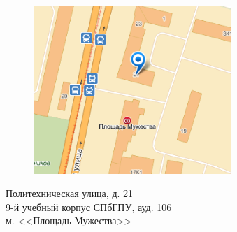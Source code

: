 \documentclass[12pt]{article}
\begin{document}
\bigskip
\bigskip

\begin{minipage}{0.5\textwidth}
\begin{figure}[H]
\includegraphics[width=7.5cm]{map.png} 
\end{figure}
\end{minipage} \hfill
\begin{minipage}{0.45\textwidth}
Политехническая улица, д. 21\\
9-й учебный корпус СПбГПУ, ауд. 106\\
м. <<Площадь Мужества>>\\
\end{minipage}
\end{document}
